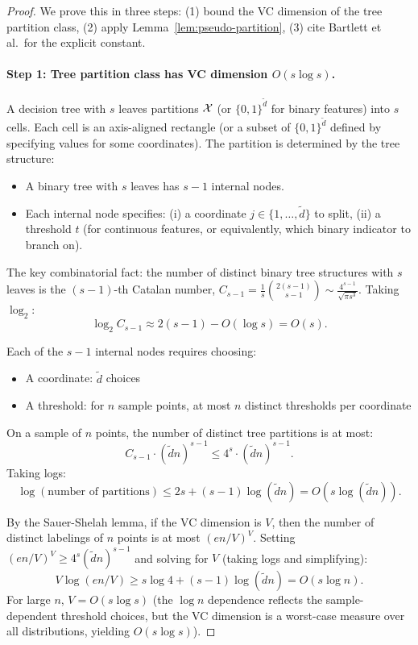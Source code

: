 \documentclass[12pt]{article}
\begin{document}
\begin{proof}
We prove this in three steps: (1) bound the VC dimension of the tree partition class, (2) apply Lemma~\ref{lem:pseudo-partition}, (3) cite Bartlett et al.\ for the explicit constant.

\paragraph{Step 1: Tree partition class has VC dimension $O(s \log s)$.}
A decision tree with $s$ leaves partitions $\mathcal{X}$ (or $\{0,1\}^{\tilde{d}}$ for binary features) into $s$ cells. Each cell is an axis-aligned rectangle (or a subset of $\{0,1\}^{\tilde{d}}$ defined by specifying values for some coordinates). The partition is determined by the tree structure:
\begin{itemize}
\item A binary tree with $s$ leaves has $s-1$ internal nodes.
\item Each internal node specifies: (i) a coordinate $j \in \{1,\ldots,\tilde{d}\}$ to split, (ii) a threshold $t$ (for continuous features, or equivalently, which binary indicator to branch on).
\end{itemize}

The key combinatorial fact: the number of distinct binary tree structures with $s$ leaves is the $(s-1)$-th Catalan number, $C_{s-1} = \frac{1}{s}\binom{2(s-1)}{s-1} \sim \frac{4^{s-1}}{\sqrt{\pi s^3}}$. Taking $\log_2$:
\[
\log_2 C_{s-1} \approx 2(s-1) - O(\log s) = O(s).
\]

Each of the $s-1$ internal nodes requires choosing:
\begin{itemize}
\item A coordinate: $\tilde{d}$ choices
\item A threshold: for $n$ sample points, at most $n$ distinct thresholds per coordinate
\end{itemize}

On a sample of $n$ points, the number of distinct tree partitions is at most:
\[
C_{s-1} \cdot (\tilde{d} n)^{s-1} \le 4^s \cdot (\tilde{d} n)^{s-1}.
\]
Taking logs:
\[
\log(\text{number of partitions}) \le 2s + (s-1) \log(\tilde{d} n) = O(s \log(\tilde{d} n)).
\]

By the Sauer-Shelah lemma, if the VC dimension is $V$, then the number of distinct labelings of $n$ points is at most $(en/V)^V$. Setting $(en/V)^V \ge 4^s (\tilde{d} n)^{s-1}$ and solving for $V$ (taking logs and simplifying):
\[
V \log(en/V) \ge s \log 4 + (s-1) \log(\tilde{d} n) = O(s \log n).
\]
For large $n$, $V = O(s \log s)$ (the $\log n$ dependence reflects the sample-dependent threshold choices, but the VC dimension is a worst-case measure over all distributions, yielding $O(s \log s)$).


\end{proof}
\end{document}
